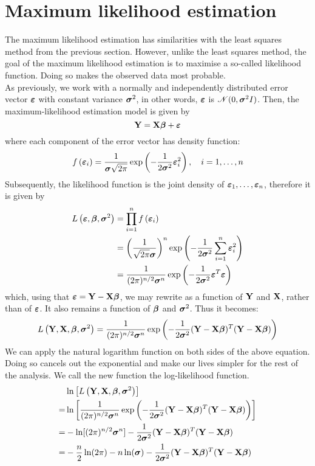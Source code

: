 \section{Maximum likelihood estimation}
\label{section: maximum likelihood}
The maximum likelihood estimation has similarities with the least squares method  from the previous section. However, unlike the least squares method, the goal of the maximum likelihood estimation is to maximise a so-called likelihood function. Doing so makes the observed data most probable. \\
As previously, we work with a normally and independently distributed error vector \(\boldsymbol{\varepsilon}\) with constant variance \(\boldsymbol{\sigma}^2\), in other words, \(\boldsymbol{\varepsilon}\) is \(\mathscr{N}(0, \boldsymbol{\sigma}^2 I)\). Then, the maximum-likelihood estimation model is given by
\[
    \mathbf{Y} = \mathbf{X} \boldsymbol{\beta} + \boldsymbol{\varepsilon}
\]
where each component of the error vector has density function:
\[
    f \left(\boldsymbol{\varepsilon}_{i}\right) = \frac{1}{\boldsymbol{\sigma} \sqrt{2 \pi}} \exp \left(-\frac{1}{2 \boldsymbol{\sigma}^{2}} \boldsymbol{\varepsilon}_{i}^{2}\right), \quad i = 1, \ldots, n
\]
Subsequently, the likelihood function is the joint density of \(\boldsymbol{\varepsilon}_1, \ldots, \boldsymbol{\varepsilon}_n\), therefore it is given by
\begin{align*}
    L\left(\boldsymbol{\varepsilon}, \boldsymbol{\beta}, \boldsymbol{\sigma}^{2}\right)
     & = \prod_{i=1}^{n} f\left(\boldsymbol{\varepsilon}_{i}\right)                                                                        \\
     & = \left( \frac{1}{\sqrt{2 \pi} \boldsymbol{\sigma}} \right)^n \exp \left(-\frac{1}{2 \boldsymbol{\sigma}^{2}} \sum_{i=1}^{n} \boldsymbol{\varepsilon}_i^2 \right) \\
     & = \frac{1}{(2 \pi)^{n / 2} \boldsymbol{\sigma}^{n}} \exp \left(-\frac{1}{2 \boldsymbol{\sigma}^{2}} \boldsymbol{\varepsilon}^T \boldsymbol{\varepsilon}\right)                        \\
\end{align*}
which, using that \(\boldsymbol{\varepsilon} = \mathbf{Y} - \mathbf{X} \boldsymbol{\beta}\), we may rewrite as a function of \(\mathbf{Y}\) and \(\mathbf{X}\), rather than of \(\boldsymbol{\varepsilon}\). It also remains a function of \(\boldsymbol{\beta}\) and \(\boldsymbol{\sigma}^2\). Thus it becomes:
\[
    L\left(\mathbf{Y}, \mathbf{X}, \boldsymbol{\beta}, \boldsymbol{\sigma}^{2}\right) = \frac{1}{(2 \pi)^{n / 2} \boldsymbol{\sigma}^{n}} \exp \left(-\frac{1}{2 \boldsymbol{\sigma}^{2}} ( \mathbf{Y} - \mathbf{X} \boldsymbol{\beta} )^T ( \mathbf{Y} - \mathbf{X} \boldsymbol{\beta} )\right)
\]
We can apply the natural logarithm function on both sides of the above equation. Doing so cancels out the exponential and make our lives simpler for the rest of the analysis.
We call the new function the log-likelihood function.
\begin{align*}
      & \ln \left[ L\left(\mathbf{Y}, \mathbf{X}, \boldsymbol{\beta}, \boldsymbol{\sigma}^{2}\right) \right]                                                                           \\
    = & \ln \left[ \frac{1}{(2 \pi)^{n / 2} \boldsymbol{\sigma}^{n}} \exp \left(-\frac{1}{2 \boldsymbol{\sigma}^{2}} ( \mathbf{Y} - \mathbf{X} \boldsymbol{\beta} )^T ( \mathbf{Y} - \mathbf{X} \boldsymbol{\beta} )\right) \right] \\
    = & - \ln [ (2 \pi)^{n / 2} \boldsymbol{\sigma}^{n} ] - \frac{1}{2 \boldsymbol{\sigma}^{2}} ( \mathbf{Y} - \mathbf{X} \boldsymbol{\beta} )^T ( \mathbf{Y} - \mathbf{X} \boldsymbol{\beta} )                                     \\
    = & - \frac{n}{2} \ln(2 \pi) -n \ln(\boldsymbol{\sigma}) - \frac{1}{2 \boldsymbol{\sigma}^{2}} ( \mathbf{Y} - \mathbf{X} \boldsymbol{\beta} )^T ( \mathbf{Y} - \mathbf{X} \boldsymbol{\beta} )                                  \\
\end{align*}

